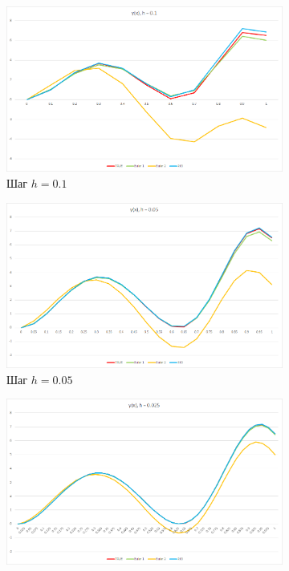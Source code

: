 \documentclass[11pt,a4paper,oneside]{article}
\begin{document}
\begin{figure}[h]
	\begin{subfigure}{0.5\textwidth}
		\centering
		\includegraphics[width=0.9\linewidth]{pics/plot1.png}
		\caption{Шаг $h=0.1$}
	\end{subfigure}
	\begin{subfigure}{0.5\textwidth}
		\centering
		\includegraphics[width=0.9\linewidth]{pics/plot2.png}
		\caption{Шаг $h=0.05$}
	\end{subfigure}
	\begin{subfigure}{0.5\textwidth}
		\centering
		\includegraphics[width=0.9\linewidth]{pics/plot3.png}

\end{subfigure}
\end{figure}
\end{document}
